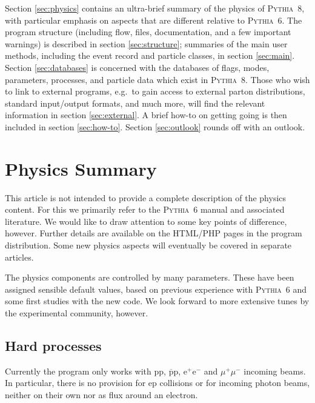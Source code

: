 \documentclass{elsartmod}
\begin{document}
Section \ref{sec:physics} contains an ultra-brief summary of the
physics of \textsc{Pythia}~8, with particular emphasis on aspects that
are different relative to \textsc{Pythia}~6. The program
structure (including flow, files, documentation, and a few important
warnings) is described in section \ref{sec:structure}; summaries of
the main user methods, including the event record and particle
classes, in section \ref{sec:main}. Section
\ref{sec:databases} is concerned with the databases of flags, modes,
parameters, processes, and particle data which exist in \textsc{Pythia}~8. 
Those who wish to link to external programs, e.g.\ to gain access
to external parton distributions, standard input/output formats, and
much more, will find the relevant information in section
\ref{sec:external}. A brief how-to on getting going is then included
in section \ref{sec:how-to}. Section \ref{sec:outlook} rounds off with
an outlook.

\section{Physics Summary \label{sec:physics}}

This article is not intended to provide a complete description of
the physics content. For this we primarily refer to the 
\textsc{Pythia}~6 manual \cite{pythiasixfour} and associated 
literature. We would like to draw attention to some key points of
difference, however. Further details are available on the HTML/PHP 
pages in the program distribution. Some new physics aspects will 
eventually be covered in separate articles.

The physics components are controlled by many parameters. These have 
been assigned sensible default values, based on previous experience 
with \textsc{Pythia}~6 and some first studies with the new code. We
look forward to more extensive tunes by the experimental community,
however. 

\subsection{Hard processes}

Currently the program only works with $\mathrm{p}\mathrm{p}$, 
$\overline{\mathrm{p}}\mathrm{p}$, $\mathrm{e}^+\mathrm{e}^-$ 
and $\mu^+\mu^-$
incoming beams. In particular, there is no provision for 
$\mathrm{e}\mathrm{p}$ collisions or for incoming photon beams, 
neither on their own nor as flux around an electron. 
\end{document}

